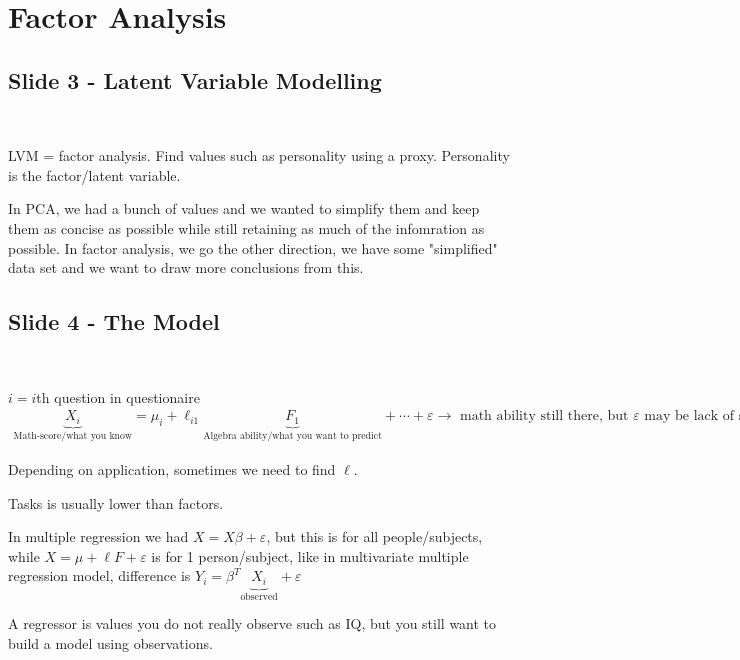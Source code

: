 \section{Factor Analysis}
\subsection{Slide 3 - Latent Variable Modelling}\hfill\\\par
\noindent LVM = factor analysis. Find values such as personality using a proxy. Personality is the factor/latent variable.
\par\bigskip
\noindent In PCA, we had a bunch of values and we wanted to simplify them and keep them as concise as possible while still retaining as much of the infomration as possible. In factor analysis, we go the other direction, we have some "simplified" data set and we want to draw more conclusions from this.
\par\bigskip
\subsection{Slide 4 - The Model}\hfill\\\par
\noindent $i = i$th question in questionaire
\begin{equation*}
  \begin{gathered}
    \underbrace{X_i}_{\text{Math-score/what you know}} = \mu_i + \ell_{i1}\underbrace{F_1}_{\text{Algebra ability/what you want to predict}}+\cdots+\varepsilon \rightarrow \text{ math ability still there, but $\varepsilon$ may be lack of sleep. If the $\varepsilon$ is convoluted, then you have not captured everything in your questionaire}
  \end{gathered}
\end{equation*}
\par\bigskip
\noindent Depending on application, sometimes we need to find $\ell$.
\par\bigskip
\noindent Tasks is usually lower than factors.
\par\bigskip
\noindent In multiple regression we had $X = X\beta + \varepsilon$, but this is for all people/subjects, while $X = \mu+\ell F+\varepsilon$  is for 1 person/subject, like in multivariate multiple regression model, difference is $Y_i = \beta^T\underbrace{X_i}_{\text{observed}}+\varepsilon$ 
\par\bigskip
\noindent A regressor is values you do not really observe such as IQ, but you still want to build a model using observations.
\par\bigskip
